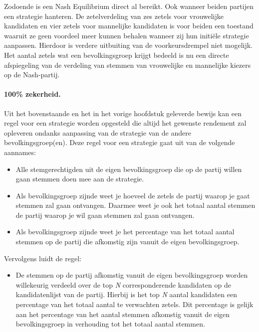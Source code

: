 Zodoende is een Nash Equilibrium direct al bereikt. Ook wanneer beiden partijen een strategie hanteren. De zetelverdeling van zes zetels voor vrouwelijke kandidaten en vier zetels voor mannelijke kandidaten is voor beiden een toestand waaruit ze geen voordeel meer kunnen behalen wanneer zij hun initi\"{e}le strategie aanpassen. Hierdoor is verdere uitbuiting van de voorkeursdrempel niet mogelijk. Het aantal zetels wat een bevolkingsgroep krijgt bedeeld is nu een directe afspiegeling van de verdeling van stemmen van vrouwelijke en mannelijke kiezers op de Nash-partij. 


\paragraph{100\% zekerheid.}
Uit het bovenstaande en het in het vorige hoofdstuk geleverde bewijs kan een regel voor een strategie worden opgesteld die altijd het gewenste rendement zal opleveren ondanks aanpassing van de strategie van de andere bevolkingsgroep(en). Deze regel voor een strategie gaat uit van de volgende aannames:
\begin{itemize}
\item
Alle stemgerechtigden uit de eigen bevolkingsgroep die op de partij willen gaan stemmen doen mee aan de strategie.
\item 
Als bevolkingsgroep zijnde weet je hoeveel de zetels de partij waarop je gaat stemmen zal gaan ontvangen. Daarmee weet je ook het totaal aantal stemmen de partij waarop je wil gaan stemmen zal gaan ontvangen.
\item 
Als bevolkingsgroep zijnde weet je het percentage van het totaal aantal stemmen op de partij die afkomstig zijn vanuit de eigen bevolkingsgroep.
\end{itemize}

\noindent Vervolgens luidt de regel: 
\begin{itemize}
\item
De stemmen op de partij afkomstig vanuit de eigen bevolkingsgroep worden willekeurig verdeeld over de top \textit{N} corresponderende kandidaten op de kandidatenlijst van de partij. Hierbij is het top \textit{N} aantal kandidaten een percentage van het totaal aantal te verwachten zetels. Dit percentage is gelijk aan het percentage van het aantal stemmen afkomstig vanuit de eigen bevolkingsgroep in verhouding tot het totaal aantal stemmen.
\end{itemize}

